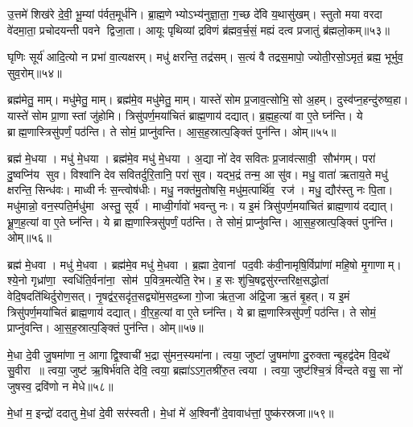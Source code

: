 उ॒त्तमे॑ शिख॑रे दे॒वी॒ भू॒म्यां प॑र्वत॒मूर्ध॑नि। ब्रा॒ह्म॒णेभ्योऽभ्य॑नुज्ञा॒ता॒ ग॒च्छ दे॑वि य॒थासु॑खम्। स्तुतो मया वरदा वे॑दमा॒ता॒ प्रचोदयन्ती पवने द्विजा॒ता। आयूः पृथिव्यां द्रविणं ब्र॑ह्मव॒र्च॒सं॒ मह्यं दत्व प्रजातुं ब्र॑ह्मलो॒कम्॥५३॥
\anuvakamend

घृणिः सूर्य॑ आदि॒त्यो न प्रभा॑ वा॒त्यक्षरम्। मधु॑ क्षरन्ति॒ तद्र॑सम्। स॒त्यं वै तद्रस॒मापो॒ ज्योती॒रसो॒ऽमृतं॒ ब्रह्म॒ भूर्भुव॒ सुव॒रोम्॥५४॥\anuvakamend

ब्रह्म॑मेतु॒ माम्। मधु॑मेतु॒ माम्। ब्रह्म॑मे॒व मधु॑मेतु॒ माम्। यास्ते॑ सोम प्र॒जाव॒त्सोभि॒ सो अ॒हम्। दुस्व॑प्न॒हन्दु॑रुष्व॒हा। यास्ते॑ सोम प्रा॒णास्तां जु॑होमि। त्रिसु॑पर्ण॒मया॑चितं ब्राह्म॒णाय॑ दद्यात्। ब्र॒ह्म॒ह॒त्यां वा ए॒ते घ्न॑न्ति। ये ब्राह्म॒णास्त्रिसु॑पर्णं॒ पठ॑न्ति। ते सोमं॒ प्राप्नु॑वन्ति। आ॒स॒ह॒स्रात्प॒ङ्क्तिं पुन॑न्ति। ओम्॥५५॥
\anuvakamend

ब्रह्म॑ मे॒धया। मधु॑ मे॒धया। ब्रह्म॑मे॒व मधु॑ मे॒धया। अ॒द्या नो॑ देव सवितः प्र॒जाव॑त्सावी॒ सौभ॑गम्। परा॑ दु॒ष्वप्नि॑य सुव। विश्वा॑नि देव सवितर्दुरि॒तानि॒ परा॑ सुव। यद्भ॒द्रं तन्म॒ आ सु॑व। मधु॒ वाता॑ ऋताय॒ते मधु॑ क्षरन्ति॒ सिन्ध॑वः। माध्वीर्नः स॒न्त्वोष॑धीः। मधु॒ नक्त॑मु॒तोषसि॒ मधु॑म॒त्पार्थि॑व॒ रज॑। मधु॒ द्यौर॑स्तु नः पि॒ता। मधु॑मान्नो॒ वन॒स्पति॒र्मधु॑मा अस्तु॒ सूर्य॑। माध्वी॒र्गावो॑ भवन्तु नः। य इ॒मं त्रिसु॑पर्ण॒मया॑चितं ब्राह्म॒णाय॑ दद्यात्। भ्रू॒ण॒ह॒त्यां वा ए॒ते घ्न॑न्ति। ये ब्राह्म॒णास्त्रिसु॑पर्णं॒ पठ॑न्ति। ते सोमं॒ प्राप्नु॑वन्ति। आ॒स॒ह॒स्रात्प॒ङ्क्तिं पुन॑न्ति। ओम्॥५६॥
\anuvakamend


ब्रह्म॑ मे॒धवा। मधु॑ मे॒धवा। ब्रह्म॑मे॒व मधु॑ मे॒धवा। ब्र॒ह्मा दे॒वानां पद॒वीः क॑वी॒नामृषि॒र्विप्रा॑णां महि॒षो मृ॒गाणाम्। श्ये॒नो गृध्रा॑णा॒ स्वधि॑ति॒र्वना॑ना॒ सोम॑ प॒वित्र॒मत्ये॑ति॒ रेभ\sn{}। ह॒सः शु॑चि॒षद्वसु॑रन्तरिक्ष॒सद्धोता॑ वेदि॒षदति॑थिर्दुरोण॒सत्। नृ॒षद्व॑र॒सदृ॑त॒सद्व्यो॑म॒सद॒ब्जा गो॒जा ऋ॑त॒जा अ॑द्रि॒जा ऋ॒तं बृ॒हत्। य इ॒मं त्रिसु॑पर्ण॒मया॑चितं ब्राह्म॒णाय॑ दद्यात्। वी॒र॒ह॒त्यां वा ए॒ते घ्न॑न्ति। ये ब्राह्म॒णास्त्रिसु॑पर्णं॒ पठ॑न्ति। ते सोमं॒ प्राप्नु॑वन्ति। आ॒स॒ह॒स्रात्प॒ङ्क्तिं पुन॑न्ति। ओम्॥५७॥
\anuvakamend

मे॒धा दे॒वी जु॒षमा॑णा न॒ आगाद्वि॒श्वाची॑ भ॒द्रा सु॑मन॒स्यमा॑ना। त्वया॒ जुष्टा॑ जु॒षमा॑णा दु॒रुक्तान्बृ॒हद्व॑देम वि॒दथे॑ सु॒वीरा॥ त्वया॒ जुष्ट॑ ऋ॒षिर्भ॑वति देवि॒ त्वया॒ ब्रह्मा॑ऽऽग॒तश्री॑रु॒त त्वया। त्वया॒ जुष्ट॑श्चि॒त्रं वि॑न्दते वसु॒ सा नो॑ जुषस्व॒ द्रवि॑णो न मेधे॥५८॥
\anuvakamend


मे॒धां म॒ इन्द्रो॑ ददातु मे॒धां दे॒वी सर॑स्वती। मे॒धां मे॑ अ॒श्विनौ॑ दे॒वावाध॑त्तां॒ पुष्क॑रस्रजा॥५९॥
\anuvakamend


